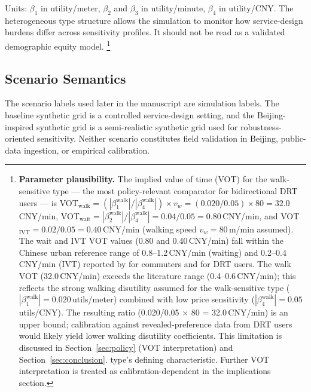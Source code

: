 Units: $\beta_1$ in utility/meter, $\beta_2$ and $\beta_3$ in utility/minute, $\beta_4$ in
utility/CNY. The heterogeneous type structure allows the simulation to monitor how
service-design burdens differ across sensitivity profiles. It should not be read as a
validated demographic equity model.%
\footnote{%
  \textbf{Parameter plausibility.}
  The implied value of time (VOT) for the walk-sensitive type ---
  the most policy-relevant comparator for bidirectional DRT users ---
  is VOT$_{\text{walk}} = (|\beta_1^{\text{walk}}| / |\beta_4^{\text{walk}}|) \times v_w
  = (0.020/0.05) \times 80 = 32.0$\,CNY/min,
  VOT$_{\text{wait}} = |\beta_2^{\text{walk}}| / |\beta_4^{\text{walk}}| = 0.04/0.05 = 0.80$\,CNY/min,
  and VOT$_{\text{IVT}} = 0.02/0.05 = 0.40$\,CNY/min (walking speed $v_w = 80$\,m/min assumed).
  The wait and IVT VOT values (0.80 and 0.40\,CNY/min) fall within the Chinese urban
  reference range of 0.8--1.2\,CNY/min (waiting) and 0.2--0.4\,CNY/min (IVT) reported
  by \citet{shao2017} for commuters and \citet{li2020drt} for DRT users.
  The walk VOT (32.0\,CNY/min) exceeds the literature range (0.4--0.6\,CNY/min);
  this reflects the strong walking disutility assumed for the walk-sensitive type
  ($|\beta_1^{\text{walk}}| = 0.020$\,utils/meter) combined with low price sensitivity
  ($|\beta_4^{\text{walk}}| = 0.05$\,utils/CNY). The resulting ratio
  (0.020/0.05 $\times$ 80 = 32.0\,CNY/min) is an upper bound; calibration against
  revealed-preference data from DRT users would likely yield lower walking
  disutility coefficients. This limitation is discussed in
  Section~\ref{sec:policy} (VOT interpretation) and Section~\ref{sec:conclusion}.
  type's defining characteristic.
  Further VOT interpretation is treated as calibration-dependent in the implications
  section.
}

\subsection{Scenario Semantics}

The scenario labels used later in the manuscript are simulation labels. The baseline
synthetic grid is a controlled service-design setting, and the Beijing-inspired synthetic
grid is a semi-realistic synthetic grid used for robustness-oriented sensitivity. Neither
scenario constitutes field validation in Beijing, public-data ingestion, or empirical
calibration.

